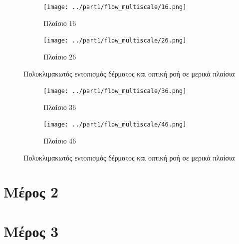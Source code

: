 \documentclass{article}
\begin{document}
\begin{figure}[h]
    \centering
    \begin{subfigure}[b]{0.49\textwidth}
        \centering{}
        \texttt{[image: ../part1/flow\_multiscale/16.png]}
        \caption{Πλαίσιο 16}
        \label{fig:}
    \end{subfigure}
    \hfill
    \begin{subfigure}[b]{0.49\textwidth}  
        \centering 
        \texttt{[image: ../part1/flow\_multiscale/26.png]}
        \caption{Πλαίσιο 26}
        \label{fig:}
    \end{subfigure}
    \caption{Πολυκλιμακωτός εντοπισμός δέρματος και οπτική ροή σε μερικά πλαίσια}
    \label{fig:flow_multiscales1}
\end{figure}
\begin{figure}[h]
    \begin{subfigure}[b]{0.49\textwidth}   
        \centering 
        \texttt{[image: ../part1/flow\_multiscale/36.png]}
        \caption{Πλαίσιο 36}
        \label{fig:}
    \end{subfigure}
    \hfill
    \begin{subfigure}[b]{0.49\textwidth}   
        \centering 
        \texttt{[image: ../part1/flow\_multiscale/46.png]}
        \caption{Πλαίσιο 46}
        \label{fig:}
    \end{subfigure}
    \caption{Πολυκλιμακωτός εντοπισμός δέρματος και οπτική ροή σε μερικά πλαίσια}
    \label{fig:flow_multiscales2}
\end{figure}

\clearpage
\section{Μέρος 2}


\clearpage
\section{Μέρος 3}
\end{document}
